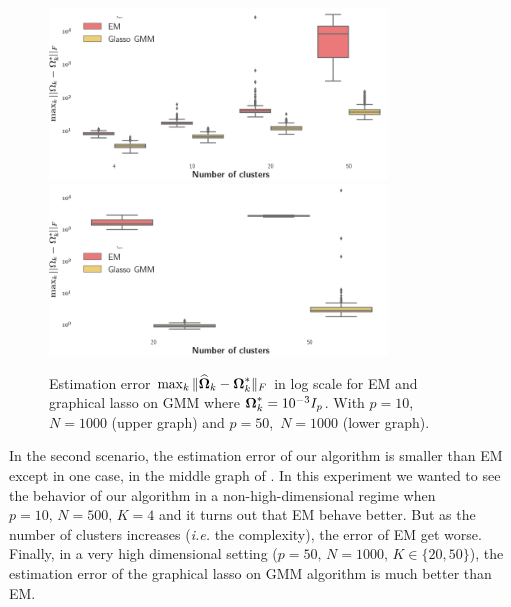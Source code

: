 \begin{figure}
\centering
\includegraphics[width=0.8\textwidth]{TeX_files/graph_lasso_10_1000.png} 
\includegraphics[width=0.8\textwidth]{TeX_files/graph_lasso_50_1000.png}
\caption{Estimation error $\max_k\|\widehat{\boldsymbol\Omega}_k-\boldsymbol\Omega_k^*\|_F$ in log scale for EM and graphical lasso on GMM where $\boldsymbol\Omega_k^*=10^{-3}I_p$.  With $p=10$, $N=1000$ (upper graph) and $p=50$,\, $N=1000$ (lower graph).}
\label{fig:glasso_res_simu2} 
\end{figure}
In the second scenario, the estimation error of our algorithm is smaller than EM except in one case, in the middle graph of . In this experiment we wanted to see the behavior of our algorithm in a non-high-dimensional regime when $p=10,\, N=500,\, K=4$ and it turns out that EM behave better. But as the number of clusters increases (\textit{i.e.} the complexity), the error of EM get worse. Finally, in a very high dimensional setting ($p=50,\, N=1000,\, K\in\{20, 50\}$), the estimation error of the graphical lasso on GMM algorithm is much better than EM.

